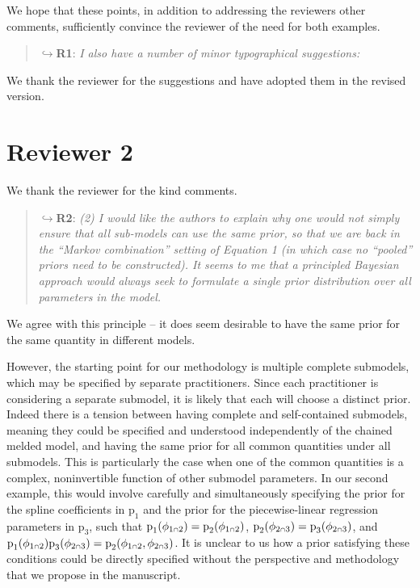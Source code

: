 \documentclass[
  10pt,
  a4paper,
]{article}
\let\Oldcap\cap
\renewcommand{\cap}{\mathrel{\mathsmaller{\Oldcap}}}
\newcommand{\pd}{\text{p}}
\begin{document}
We hope that these points, in addition to addressing the reviewers other
comments, sufficiently convince the reviewer of the need for both
examples.

\begin{quote}
\(\hookrightarrow\)\textbf{R1}: \emph{I also have a number of minor
typographical suggestions:}
\end{quote}

We thank the reviewer for the suggestions and have adopted them in the
revised version.

\hypertarget{reviewer-2}{%
\section*{Reviewer 2}\label{reviewer-2}}

We thank the reviewer for the kind comments.

\begin{quote}
\(\hookrightarrow\)\textbf{R2}: \emph{(2) I would like the authors to
explain why one would not simply ensure that all sub-models can use the
same prior, so that we are back in the ``Markov combination'' setting of
Equation 1 (in which case no ``pooled'' priors need to be constructed).
It seems to me that a principled Bayesian approach would always seek to
formulate a single prior distribution over all parameters in the model.}
\end{quote}

We agree with this principle -- it does seem desirable to have the same
prior for the same quantity in different models.

However, the starting point for our methodology is multiple complete
submodels, which may be specified by separate practitioners. Since each
practitioner is considering a separate submodel, it is likely that each
will choose a distinct prior. Indeed there is a tension between having
complete and self-contained submodels, meaning they could be specified
and understood independently of the chained melded model, and having the
same prior for all common quantities under all submodels. This is
particularly the case when one of the common quantities is a complex,
noninvertible function of other submodel parameters. In our second
example, this would involve carefully and simultaneously specifying the
prior for the spline coefficients in \(\pd_{1}\) and the prior for the
piecewise-linear regression parameters in \(\pd_{3}\), such that
\(\pd_{1}(\phi_{1 \cap 2}) = \pd_{2}(\phi_{1 \cap 2})\),
\(\pd_{2}(\phi_{2 \cap 3}) = \pd_{3}(\phi_{2 \cap 3})\), and
\(\pd_{1}(\phi_{1 \cap 2})\pd_{3}(\phi_{2 \cap 3}) = \pd_{2}(\phi_{1 \cap 2}, \phi_{2 \cap 3})\).
It is unclear to us how a prior satisfying these conditions could be
directly specified without the perspective and methodology that we
propose in the manuscript.
\end{document}
